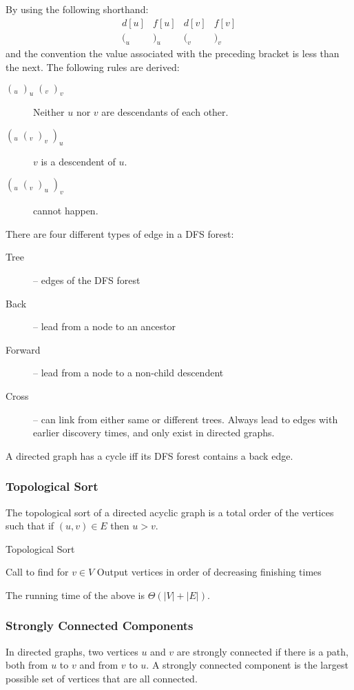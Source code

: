\documentclass[10pt]{article}
\begin{document}
By using the following shorthand:\[\begin{matrix} d[u]&f[u]&d[v]&f[v]\\(_u&)_u&(_v&)_v\end{matrix}\]and the convention the value associated with the preceding bracket is less than the next.  The following rules are derived:
\begin{description}
	\item[$(_u\;)_u\;(_v\;)_v$]Neither $u$ nor $v$ are descendants of each other.
	\item[$(_u\;(_v\;)_v\;)_u$]$v$ is a descendent of $u$.
	\item[$(_u\;(_v\;)_u\;)_v$]cannot happen.
\end{description}
There are four different types of edge in a DFS forest:
\begin{description}
\item[Tree] -- edges of the DFS forest
\item[Back] -- lead from a node to an ancestor
\item[Forward] -- lead from a node to a non-child descendent
\item[Cross] -- can link from either same or different trees.  Always lead to edges with earlier discovery times, and only exist in directed graphs.
\end{description}
A directed graph has a cycle iff its DFS forest contains a back edge.
\subsubsection{Topological Sort}
The topological sort of a directed acyclic graph is a total order of the vertices such that if $(u,v)\in E$ then $u>v$.
\begin{algorithm}
	\caption{Topological Sort}
	Call  to find  for $v\in V$\;
	Output vertices in order of decreasing finishing times\;
\end{algorithm}
The running time of the above is $\Theta(|V|+|E|)$.
\subsubsection{Strongly Connected Components}
In directed graphs, two vertices $u$ and $v$ are strongly connected if there is a path, both from $u$ to $v$ and from $v$ to $u$.  A strongly connected component is the largest possible set of vertices that are all connected.
\end{document}
